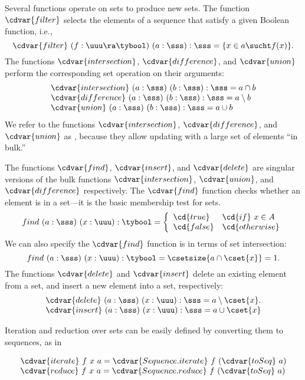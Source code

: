 \begin{gram}
%
Several functions operate on sets to produce new sets.
%
The function $\cdvar{filter}$ selects the elements of a sequence that
satisfy a given Boolean function, i.e., 
%
\[
\cdvar{filter}~(f : \uuu \ra \tybool)~(a : \sss) : \sss = \{ x \in a \sucht f(x)\} .
\]
%
The functions $\cdvar{intersection}$, $\cdvar{difference}$, and $\cdvar{union}$
perform the corresponding set operation on their arguments:
%
\[
\begin{array}{l}
\cdvar{intersection}~(a : \sss)~(b : \sss) : \sss = a \cap b\\
\cdvar{difference}~(a  : \sss)~(b : \sss) : \sss = a \setminus b\\
\cdvar{union}~(a : \sss)~(b : \sss) : \sss = a \cup b
\end{array}
\]
%
We refer to the functions  $\cdvar{intersection}$, $\cdvar{difference}$, and $\cdvar{union}$
as , because they allow updating with a large set
of elements ``in bulk.''
\end{gram}

\begin{gram}
The functions $\cdvar{find}$, $\cdvar{insert}$, and $\cdvar{delete}$ are singular
versions of the bulk functions $\cdvar{intersection}$, $\cdvar{union}$, and
$\cdvar{difference}$ respectively.
%
The $\cdvar{find}$ function checks whether an element is in a set---it is
the basic membership test for sets.
%
\[
find~(a  : \sss)~(x : \uuu) : \tybool = \left\{
                \begin{array}{ll}
                \cd{true} & \cd{if}~x \in A \\
                \cd{false} & \cd{otherwise}
                \end{array} \right.
\]
%
We can also specify the $\cdvar{find}$ function is in terms of set
intersection:
\[
find~(a : \sss)~(x : \uuu) : \tybool = \csetsize{a \cap \cset{x}} = 1.
\]
%
The functions $\cdvar{delete}$ and $\cdvar{insert}$ 
%
delete an existing element from a set, and
%
insert a new element into a set,
%
respectively:
%
\[
\begin{array}{l}
\cdvar{delete}~(a  : \sss)~(x  : \uuu) : \sss = a \setminus \cset{x}.\\
\cdvar{insert}~(a : \sss)~(x : \uuu) : \sss = a \cup \cset{x}
\end{array}
\]
%
\end{gram}

\begin{gram}
Iteration and reduction over sets can be easily defined by converting
them to sequences, as in

\[
\begin{array}{l}
\cdvar{iterate}~f~x~a = \cdvar{Sequence.iterate}~f~(\cdvar{toSeq}~a)\\
\cdvar{reduce}~f~x~a = \cdvar{Sequence.reduce}~f~(\cdvar{toSeq}~a)
\end{array}
\]
\end{gram}


